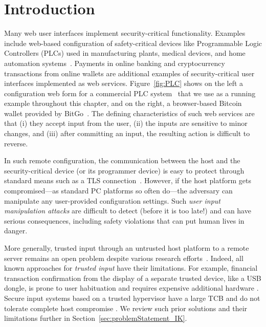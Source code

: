 \section{Introduction}
\label{sec:introduction}

Many web user interfaces implement security-critical functionality. Examples include web-based configuration of safety-critical devices like Programmable Logic Controllers (PLCs) used in manufacturing plants, medical devices, and home automation systems~\cite{7306669,siemens,siemens2,schneider}. Payments in online banking and cryptocurrency transactions from online wallets are additional examples of security-critical user interfaces implemented as web services. Figure~\ref{fig:PLC} shows on the left a configuration web form for a commercial PLC system~\cite{controlbyweb} that we use as a running example throughout this chapter, and on the right, a browser-based Bitcoin wallet provided by BitGo~\cite{bitgo}. The defining characteristics of such web services are that (i) they accept input from the user, (ii) the inputs are sensitive to minor changes, and (iii) after committing an input, the resulting action is difficult to reverse.

In such remote configuration, the communication between the host and the security-critical device (or its programmer device) is easy to protect through standard means such as a TLS connection~\cite{dierks2008transport}. However, if the host platform gets compromised---as standard PC platforms so often do---the adversary can manipulate any user-provided configuration settings. Such \emph{user input manipulation attacks} are difficult to detect (before it is too late!) and can have serious consequences, including safety violations that can put human lives in danger.


More generally, trusted input through an untrusted host platform to a remote server remains an open problem despite various research efforts~\cite{sgxio,utp,x86,wimpyKernel,gyrus,weigold2011}. Indeed, all known approaches for \emph{trusted input} have their limitations. For example, financial transaction confirmation from the display of a separate trusted device, like a USB dongle, is prone to user habituation and requires expensive additional hardware \cite{weigold2011}. Secure input systems based on a trusted hypervisor have a large TCB and do not tolerate complete host compromise \cite{sgxio}. We review such prior solutions and their limitations further in Section~\ref{sec:problemStatement_IK}.




